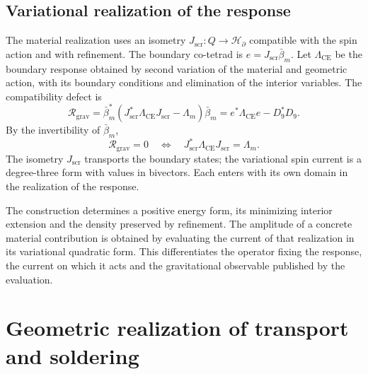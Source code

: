 \section{Variational realization of the response}
\label{x_reciprocidad:vii:sec:realizacion-respuesta}

The material realization uses an isometry
\(J_{\mathrm{scr}}:Q\longrightarrow\mathcal H_\partial\)
compatible with the spin action and with refinement.
The boundary co-tetrad is \(e=J_{\mathrm{scr}}\bar\beta_m\).
Let \(\Lambda_{\mathrm{CE}}\) be the boundary response obtained
by second variation of the material and geometric action, with its
boundary conditions and elimination of the interior variables.
The compatibility defect is
\begin{equation}
 \mathcal R_{\mathrm{grav}}
 =\bar\beta_m^*
   (J_{\mathrm{scr}}^*\Lambda_{\mathrm{CE}}J_{\mathrm{scr}}-\Lambda_m)
   \bar\beta_m
 =e^*\Lambda_{\mathrm{CE}}e-D_9^*D_9.
 \label{x_reciprocidad:vii:eq:defecto-respuesta}
\end{equation}
By the invertibility of \(\bar\beta_m\),
\[
 \mathcal R_{\mathrm{grav}}=0
 \quad\Longleftrightarrow\quad
 J_{\mathrm{scr}}^*\Lambda_{\mathrm{CE}}J_{\mathrm{scr}}=\Lambda_m.
\]
The isometry \(J_{\mathrm{scr}}\) transports the boundary states;
the variational spin current is a degree-three form with values
in bivectors. Each enters with its own domain in the
realization of the response.

The construction determines a positive energy form, its minimizing
interior extension and the density preserved by refinement.
The amplitude of a concrete material contribution is obtained by evaluating
the current of that realization in its variational quadratic form.
This differentiates the operator fixing the response, the current
on which it acts and the gravitational observable published by the evaluation.




\chapter{Geometric realization of transport and soldering}
\label{x_reciprocidad:vii:sec:realizacion-cartan}

